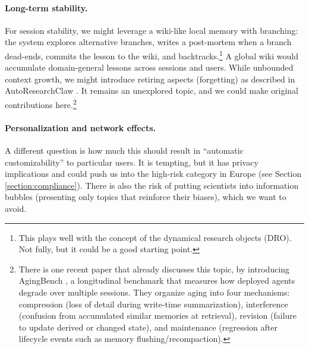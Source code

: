 \paragraph{Long-term stability.}
For session stability, we might leverage a wiki-like local memory with branching: the system explores alternative branches, writes a post-mortem when a branch dead-ends, commits the lesson to the wiki, and backtracks.\footnote{This plays well with the concept of the dynamical research objects (DRO). Not fully, but it could be a good starting point.} A global wiki would accumulate domain-general lessons across sessions and users. While unbounded context growth, we might introduce retiring aspects (forgetting) as described in AutoResearchClaw \cite{2605.20025}. It remains an unexplored topic, and we could make original contributions here.\footnote{
    There is one recent paper that already discusses this topic, by introducing AgingBench \cite{2605.26302}, a longitudinal benchmark that measures how deployed agents degrade over multiple sessions. They organize aging into four mechanisms: compression (loss of detail during write-time summarization), interference (confusion from accumulated similar memories at retrieval), revision (failure to update derived or changed state), and maintenance (regression after lifecycle events such as memory flushing/recompaction).
}

\paragraph{Personalization and network effects.}
A different question is how much this should result in ``automatic customizability'' to particular users. It is tempting, but it has privacy implications and could push us into the high-risk category in Europe (see Section \ref{section:compliance}). There is also the risk of putting scientists into information bubbles (presenting only topics that reinforce their biases), which we want to avoid.

